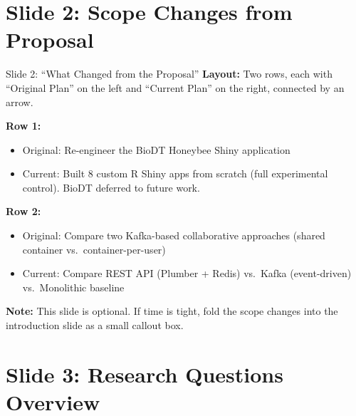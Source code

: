 \documentclass[12pt,a4paper]{article}
\begin{document}
\section{Slide 2: Scope Changes from Proposal}

\begin{slidebox}{Slide 2: ``What Changed from the Proposal''}
\textbf{Layout:} Two rows, each with ``Original Plan'' on the left and ``Current Plan'' on the right, connected by an arrow.

\textbf{Row 1:}
\begin{itemize}[nosep]
  \item Original: Re-engineer the BioDT Honeybee Shiny application
  \item Current: Built 8 custom R Shiny apps from scratch (full experimental control). BioDT deferred to future work.
\end{itemize}

\textbf{Row 2:}
\begin{itemize}[nosep]
  \item Original: Compare two Kafka-based collaborative approaches (shared container vs.\ container-per-user)
  \item Current: Compare REST API (Plumber + Redis) vs.\ Kafka (event-driven) vs.\ Monolithic baseline
\end{itemize}

\textbf{Note:} This slide is optional. If time is tight, fold the scope changes into the introduction slide as a small callout box.
\end{slidebox}

\section{Slide 3: Research Questions Overview}
\end{document}
